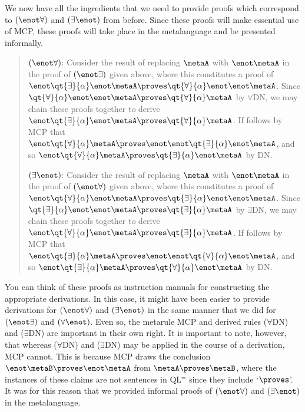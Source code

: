 We now have all the ingredients that we need to provide proofs which correspond to $(\enot\forall)$ and $(\exists\enot)$ from before.
Since these proofs will make essential use of MCP, these proofs will take place in the metalanguage and be presented informally.

\vspace{-.1in}
\begin{quote}
  $(\enot\forall)$:
  Consider the result of replacing $\metaA$ with $\enot\metaA$ in the proof of $(\enot\exists)$ given above, where this constitutes a proof of $\enot\qt{\exists}{\alpha}\enot\metaA \proves \qt{\forall}{\alpha}\enot\enot\metaA$.
  Since $\qt{\forall}{\alpha}\enot\enot\metaA \proves \qt{\forall}{\alpha}\metaA$ by $\forall$DN, we may chain these proofs together to derive $\enot\qt{\exists}{\alpha}\enot\metaA \proves \qt{\forall}{\alpha}\metaA$.
  If follows by MCP that $\enot\qt{\forall}{\alpha}\metaA \proves \enot\enot\qt{\exists}{\alpha}\enot\metaA$, and so $\enot\qt{\forall}{\alpha}\metaA \proves \qt{\exists}{\alpha}\enot\metaA$ by DN. 
  
  $(\exists\enot)$:
  Consider the result of replacing $\metaA$ with $\enot\metaA$ in the proof of $(\enot\forall)$ given above, where this constitutes a proof of $\enot\qt{\forall}{\alpha}\enot\metaA \proves \qt{\exists}{\alpha}\enot\enot\metaA$.
  Since $\qt{\exists}{\alpha}\enot\enot\metaA \proves \qt{\exists}{\alpha}\metaA$ by $\exists$DN, we may chain these proofs together to derive $\enot\qt{\forall}{\alpha}\enot\metaA \proves \qt{\exists}{\alpha}\metaA$.
  If follows by MCP that $\enot\qt{\exists}{\alpha}\metaA \proves \enot\enot\qt{\forall}{\alpha}\enot\metaA$, and so $\enot\qt{\exists}{\alpha}\metaA \proves \qt{\forall}{\alpha}\enot\metaA$ by DN. 
\end{quote}
\vspace{.1in}

You can think of these proofs as instruction manuals for constructing the appropriate derivations.
In this case, it might have been easier to provide derivations for $(\enot\forall)$ and $(\exists\enot)$ in the same manner that we did for $(\enot\exists)$ and $(\forall\enot)$.
Even so, the metarule MCP and derived rules ($\forall$DN) and ($\exists$DN) are important in their own right.
It is important to note, however, that whereas ($\forall$DN) and ($\exists$DN) may be applied in the course of a derivation, MCP cannot.
This is because MCP draws the conclusion $\enot\metaB \proves \enot\metaA$ from $\metaA \proves \metaB$, where the instances of these claims are not sentences in QL$^=$ since they include `$\proves$'.
It was for this reason that we provided informal proofs of $(\enot\forall)$ and $(\exists\enot)$ in the metalanguage. 

